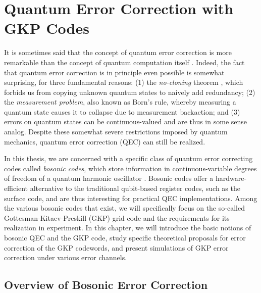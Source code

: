 \chapter{Quantum Error Correction with GKP Codes\label{ch:2_QEC}}

It is sometimes said that the concept of quantum error correction is more remarkable than the concept of quantum computation itself \cite{girvin2019QECvideo}. Indeed, the fact that quantum error correction is in principle even possible is somewhat surprising, for three fundamental reasons: (1) the \textit{no-cloning} theorem \cite{ike-and-mike}, which forbids us from copying unknown quantum states to naively add redundancy; (2) the \textit{measurement problem}, also known as Born's rule, whereby measuring a quantum state causes it to collapse due to measurement backaction; and (3) errors on quantum states can be continuous-valued and are thus in some sense analog. Despite these somewhat severe restrictions imposed by quantum mechanics, quantum error correction (QEC) can still be realized. 


In this thesis, we are concerned with a specific class of quantum error correcting codes called \textit{bosonic codes}, which store information in continuous-variable degrees of freedom of a quantum harmonic oscillator \cite{terhal2020bosonic, cai2021bosonic, joshi2021bosonic}. Bosonic codes offer a hardware-efficient alternative to the traditional qubit-based register codes, such as the surface code, and are thus interesting for practical QEC implementations. Among the various bosonic codes that exist, we will specifically focus on the so-called Gottesman-Kitaev-Preskill (GKP) grid code and the requirements for its realization in experiment. In this chapter, we will introduce the basic notions of bosonic QEC and the GKP code, study specific theoretical proposals for error correction of the GKP codewords, and present simulations of GKP error correction under various error channels. 

\section{Overview of Bosonic Error Correction}
